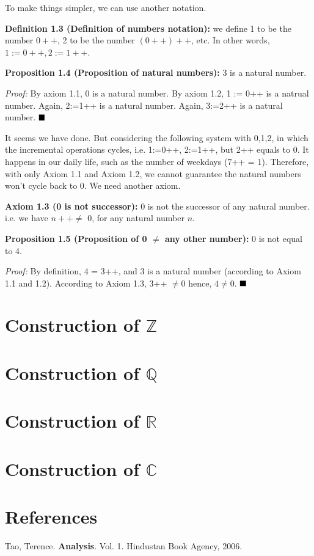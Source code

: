 \documentclass{article}
\theoremstyle{definition}
\begin{document}
To make things simpler, we can use another notation.

\noindent\textbf{Definition 1.3 (Definition of numbers notation):} we define 1 to be the number $0++$, 2 to be the number $(0++)++$, etc. In other words, $1 := 0++, 2 := 1++$.

\noindent\textbf{Proposition 1.4 (Proposition of natural numbers):} 3 is a natural number.

\textit{Proof:} By axiom 1.1, 0 is a natural number. By axiom 1.2, 1 := 0++ is a natrual number. Again, 2:=1++ is a natural number. Again, 3:=2++ is a natural number. $\hfill\blacksquare$

It seems we have done. But considering the following system with 0,1,2, in which the incremental operations cycles, i.e. 1:=0++, 2:=1++, but 2++ equals to 0. It happens in our daily life, such as the number of weekdays (7++ = 1). Therefore, with only Axiom 1.1 and Axiom 1.2, we cannot guarantee the natural numbers won't cycle back to 0. We need another axiom.

\noindent\textbf{Axiom 1.3 (0 is not successor):} 0 is not the successor of any natural number. i.e. we have $ n++ \neq$ 0, for any natural number $n$.

\noindent\textbf{Proposition 1.5 (Proposition of 0 $\neq$ any other number):} 0 is not equal to 4.

\textit{Proof:} By definition, 4 = 3++, and 3 is a natural number (according to Axiom 1.1 and 1.2). According to Axiom 1.3, 3++ $\neq 0$ hence, $4 \neq 0$. $\hfill\blacksquare$

\section{Construction of $\mathbb{Z}$}

\section{Construction of $\mathbb{Q}$}

\section{Construction of $\mathbb{R}$}

\section{Construction of $\mathbb{C}$}

\section{References}

Tao, Terence. \textbf{Analysis}. Vol. 1. Hindustan Book Agency, 2006.
\end{document}
